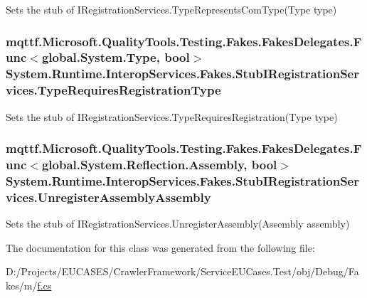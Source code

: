 Sets the stub of I\-Registration\-Services.\-Type\-Represents\-Com\-Type(\-Type type)

\hypertarget{class_system_1_1_runtime_1_1_interop_services_1_1_fakes_1_1_stub_i_registration_services_aa9910d336f9fa29e7f40d3f847368ee3}{
\subsubsection[{Type\-Requires\-Registration\-Type}]{\setlength{\rightskip}{0pt plus 5cm}mqttf.\-Microsoft.\-Quality\-Tools.\-Testing.\-Fakes.\-Fakes\-Delegates.\-Func$<$global.\-System.\-Type, bool$>$ System.\-Runtime.\-Interop\-Services.\-Fakes.\-Stub\-I\-Registration\-Services.\-Type\-Requires\-Registration\-Type}}\label{class_system_1_1_runtime_1_1_interop_services_1_1_fakes_1_1_stub_i_registration_services_aa9910d336f9fa29e7f40d3f847368ee3}


Sets the stub of I\-Registration\-Services.\-Type\-Requires\-Registration(\-Type type)

\hypertarget{class_system_1_1_runtime_1_1_interop_services_1_1_fakes_1_1_stub_i_registration_services_aef78ce6818fb8d488146112ddff75f91}{
\subsubsection[{Unregister\-Assembly\-Assembly}]{\setlength{\rightskip}{0pt plus 5cm}mqttf.\-Microsoft.\-Quality\-Tools.\-Testing.\-Fakes.\-Fakes\-Delegates.\-Func$<$global.\-System.\-Reflection.\-Assembly, bool$>$ System.\-Runtime.\-Interop\-Services.\-Fakes.\-Stub\-I\-Registration\-Services.\-Unregister\-Assembly\-Assembly}}\label{class_system_1_1_runtime_1_1_interop_services_1_1_fakes_1_1_stub_i_registration_services_aef78ce6818fb8d488146112ddff75f91}


Sets the stub of I\-Registration\-Services.\-Unregister\-Assembly(\-Assembly assembly)



The documentation for this class was generated from the following file\-:\begin{DoxyCompactItemize}
\item 
D\-:/\-Projects/\-E\-U\-C\-A\-S\-E\-S/\-Crawler\-Framework/\-Service\-E\-U\-Cases.\-Test/obj/\-Debug/\-Fakes/m/\hyperlink{m_2f_8cs}{f.\-cs}\end{DoxyCompactItemize}
